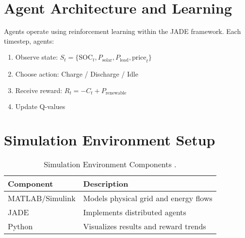 \documentclass[12pt]{report}
\begin{document}
\section{Agent Architecture and Learning}
\begin{doublespace}
Agents operate using reinforcement learning within the JADE framework. Each timestep, agents:
\begin{enumerate}
    \item Observe state: \( S_t = \{ \text{SOC}_t, P_{\text{solar}}, P_{\text{load}}, \text{price}_t \} \)
    \item Choose action: Charge / Discharge / Idle
    \item Receive reward: \( R_t = -C_t + P_{\text{renewable}} \)
    \item Update Q-values
\end{enumerate}
\end{doublespace}

\section{Simulation Environment Setup}
\begin{doublespace}
\begin{table}[h]
    \centering
    \caption{Simulation Environment Components \cite{MNRE2023}.}
    \label{tab:simulation_setup}
    \begin{tabular}{ll}
        \toprule
        \textbf{Component} & \textbf{Description} \\
        \midrule
        MATLAB/Simulink & Models physical grid and energy flows \\
        JADE & Implements distributed agents \\
        Python & Visualizes results and reward trends \\
        \bottomrule
    \end{tabular}
\end{table}
\end{doublespace}
\end{document}
